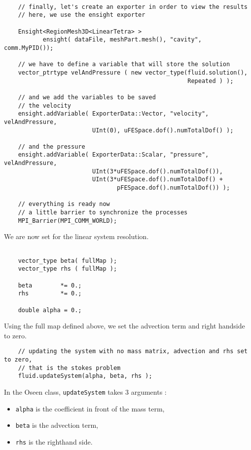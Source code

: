 {\begin{verbatim}

    // finally, let's create an exporter in order to view the results
    // here, we use the ensight exporter

    Ensight<RegionMesh3D<LinearTetra> >
           ensight( dataFile, meshPart.mesh(), "cavity", comm.MyPID());

    // we have to define a variable that will store the solution
    vector_ptrtype velAndPressure ( new vector_type(fluid.solution(),
                                                    Repeated ) );

    // and we add the variables to be saved
    // the velocity
    ensight.addVariable( ExporterData::Vector, "velocity", velAndPressure,
                         UInt(0), uFESpace.dof().numTotalDof() );

    // and the pressure
    ensight.addVariable( ExporterData::Scalar, "pressure", velAndPressure,
                         UInt(3*uFESpace.dof().numTotalDof()),
                         UInt(3*uFESpace.dof().numTotalDof() +
                                pFESpace.dof().numTotalDof()) );

    // everything is ready now
    // a little barrier to synchronize the processes
    MPI_Barrier(MPI_COMM_WORLD);
\end{verbatim}


We are now set for the linear system resolution.

\begin{verbatim}

    vector_type beta( fullMap );
    vector_type rhs ( fullMap );

    beta        *= 0.;
    rhs         *= 0.;

    double alpha = 0.;
\end{verbatim}

Using the full map defined above, we set the advection term and right handside to zero.


\begin{verbatim}
    // updating the system with no mass matrix, advection and rhs set to zero,
    // that is the stokes problem
    fluid.updateSystem(alpha, beta, rhs );
\end{verbatim}

In the Oseen class, \verb|updateSystem| takes 3 arguments :
\begin{itemize}
\item \verb|alpha| is the coefficient in front of the mass term,
\item \verb|beta| is the advection term,
\item \verb|rhs| is the righthand side.
\end{itemize}

}
